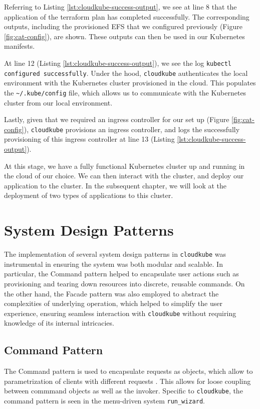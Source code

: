 Referring to Listing \ref{lst:cloudkube-success-output}, we see at line 8 that the application of the terraform plan has completed
successfully. The corresponding outputs, including the provisioned EFS that we configured previously (Figure \ref{fig:cat-config}), are shown.
These outputs can then be used in our Kubernetes manifests.

At line 12 (Listing \ref{lst:cloudkube-success-output}), we see the log \texttt{kubectl configured successfully}. Under the hood,
\texttt{cloudkube} authenticates the local environment with the Kubernetes cluster provisioned in the cloud. This populates the 
\texttt{\textasciitilde/.kube/config} file, which allows us to communicate with the Kubernetes cluster from our local environment. 

Lastly, given that we required an ingress controller for our set up (Figure \ref{fig:cat-config}), \texttt{cloudkube} provisions an
ingress controller, and logs the successfully provisioning of this ingress controller at line 13 (Listing \ref{lst:cloudkube-success-output}).

At this stage, we have a fully functional Kubernetes cluster up and running in the cloud of our choice. We can then interact with the cluster,
and deploy our application to the cluster. In the subsequent chapter, we will look at the deployment of two types of applications
to this cluster. 



\section{System Design Patterns}
The implementation of several system design patterns in \texttt{cloudkube} was instrumental in ensuring the system
was both modular and scalable. In particular, the Command pattern helped to encapsulate user actions such as provisioning and tearing
down resources into discrete, reusable commands. On the other hand, the Facade pattern was also employed to abstract the 
complexities of underlying operation, which helped to simplify the user experience, ensuring seamless interaction with \texttt{cloudkube}
without requiring knowledge of its internal intricacies. 

\subsection{Command Pattern}
The Command pattern is used to encapsulate requests as objects, which allow to parametrization of clients
with different requests \cite{gamma1994design}. This allows for loose coupling between commmand objects as well
as the invoker. Specific to \texttt{cloudkube}, the command pattern is seen in the menu-driven system \texttt{run\_wizard}.


